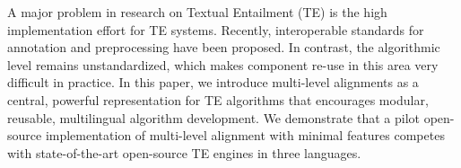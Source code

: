 A major problem in research on Textual Entailment (TE) is the high implementation effort for TE systems. Recently, interoperable standards for annotation and preprocessing have been proposed. In contrast, the algorithmic level remains unstandardized, which makes component re-use in this area very difficult in practice. In this paper, we introduce multi-level alignments as a central, powerful representation for TE algorithms that encourages modular, reusable, multilingual algorithm development. We demonstrate that a pilot open-source implementation of multi-level alignment with minimal features competes with state-of-the-art open-source TE engines in three languages.
